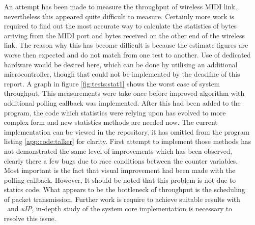   An attempt has been made to measure the throughput of wireless MIDI link,
 nevertheless this appeared quite difficult to measure. Certainly more work
 is required to find out the most accurate way to calculate the statistics
 of bytes arriving from the MIDI port and bytes received on the other end
 of the wireless link. The reason why this has become difficult is because
 the estimate figures are worse then expected and do not match from one
 test to another. Use of dedicated hardware would be desired here, which
 can be done by utilising an additional microcontroller, though that could
 not be implemented by the deadline of this report.
  A graph in figure \ref{fig:tests:stat1} shows the worst case of system
 throughput. This measurements were take once before improved algorithm
 with additional polling callback was implemented. After this had been
 added to the program, the code which statistics were relying upon has
 evolved to more complex form and new statistics methods are needed now.
 The current implementation can be viewed in the repository, it has omitted
 from the program listing \ref{app:code:talker} for clarity.
 First attempt to implement those methods has not demonstrated the same
 level of improvements which has been observed, clearly there a few bugs
 due to race conditions between the counter variables. Most important is
 the fact that visual improvement had been made with the polling callback.
 However, It should be noted that this problem is not due to statics code.
 What appears to be the bottleneck of throughput is the scheduling of packet
 transmission. Further work is require to achieve suitable results with
 \Contiki\ and \emph{uIP}, in-depth study of the system core implementation
 is necessary to resolve this issue.

